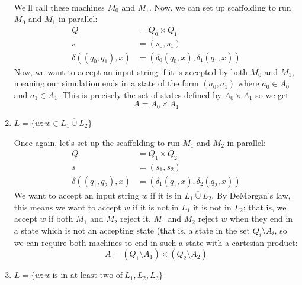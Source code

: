 \documentclass[fleqn]{article}
\begin{document}
\begin{enumerate}
\begin{answer}
 \\
        We'll call these machines $M_0$ and $M_1$. Now, we can set up scaffolding to run $M_0$ and $M_1$ in parallel:
        \[
            \begin{aligned}
                Q &= Q_0 \times Q_1 \\
                s &= (s_0, s_1) \\
                \delta((q_0,q_1), x) &= (\delta_0(q_0,x),\delta_1(q_1,x))
            \end{aligned}
        \]
        Now, we want to accept an input string if it is accepted by both $M_0$ and $M_1$, meaning our simulation ends in a state of the form $(a_0, a_1)$ where $a_0 \in A_0$ and $a_1 \in A_1$. This is precisely the set of states defined by $A_0 \times A_1$ so we get
        \[
            A = A_0 \times A_1
        \]
    \end{answer}
    \item $L = \{w : w \in \overline{L_1 \cup L_2}\}$
    \begin{answer}
        Once again, let's set up the scaffolding to run $M_1$ and $M_2$ in parallel:
        \[
            \begin{aligned}
                Q &= Q_1 \times Q_2 \\
                s &= (s_1, s_2) \\
                \delta((q_1,q_2),x) &= (\delta_1(q_1,x), \delta_2(q_2,x))
            \end{aligned}
        \]
        We want to accept an input string $w$ if it is in $\overline{L_1 \cup L_2}$. By DeMorgan's law, this means we want to accept $w$ if it is not in $L_1$  it is not in $L_2$; that is, we accept $w$ if both $M_1$ and $M_2$ reject it. $M_1$ and $M_2$ reject $w$ when they end in a state which is not an accepting state (that is, a state in the set $Q_i \setminus A_i$, so we can require both machines to end in such a state with a cartesian product:
        \[
            A = (Q_1 \setminus A_1) \times (Q_2 \setminus A_2)
        \]
    \end{answer}
    \item $L = \{w : w~\text{is in at least two of}~L_1,L_2,L_3\}$
    \begin{answer}

\end{answer}
\end{enumerate}
\end{document}

